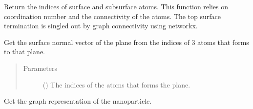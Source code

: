 \documentclass[letterpaper,10pt,english]{sphinxmanual}
\begin{document}
\begin{fulllineitems}
\begin{fulllineitems}
\end{fulllineitems}


\begin{fulllineitems}
\label{\detokenize{modules:acat.adsorption_sites.SlabAdsorptionSites.get_termination}}
Return the indices of surface and subsurface atoms. This
function relies on coordination number and the connectivity
of the atoms. The top surface termination is singled out by
graph connectivity using networkx.

\end{fulllineitems}


\begin{fulllineitems}
\label{\detokenize{modules:acat.adsorption_sites.SlabAdsorptionSites.get_surface_normal}}
Get the surface normal vector of the plane from the indices
of 3 atoms that forms to that plane.
\begin{quote}\begin{description}
\item[{Parameters}] \leavevmode
{} () \textendash{} The indices of the atoms that forms the plane.

\end{description}\end{quote}

\end{fulllineitems}


\begin{fulllineitems}
\label{\detokenize{modules:acat.adsorption_sites.SlabAdsorptionSites.get_graph}}
Get the graph representation of the nanoparticle.


\end{fulllineitems}
\end{fulllineitems}
\end{document}

